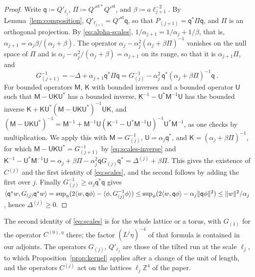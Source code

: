 \documentclass[11pt]{preprint}
\DeclarePairedDelimiter{\norm}{\lVert}{\rVert}
\numberwithin{equation}{section}
\theoremstyle{definition}
\theoremstyle{remark}
\theoremstyle{plain}
\begin{document}
\begin{proof}
Write $\mathsf q \coloneqq Q'_{\ell_j}$, $\Pi \coloneqq Q'^{\mathrm{st}*}Q'^{\mathrm{st}}$, and $\beta \coloneqq a\ell_{j+1}^{-2}$. By Lemma~\ref{lem:composition}, $Q'_{\ell_{j+1}} = Q'^{\mathrm{st}}\mathsf q$, so that $P_{(j+1)} = \mathsf q^*\Pi\mathsf q$, and $\Pi$ is an orthogonal projection. By \eqref{eq:alpha-scales}, $1/\alpha_{j+1} = 1/\alpha_j + 1/\beta$, that is, $\alpha_{j+1} = \alpha_j\beta/(\alpha_j + \beta)$. The operator $\alpha_j - \alpha_j^2(\alpha_j + \beta\Pi)^{-1}$ vanishes on the null space of $\Pi$ and is $\alpha_j - \alpha_j^2/(\alpha_j + \beta) = \alpha_{j+1}$ on its range, so that it is $\alpha_{j+1}\Pi$, and
\begin{equation}\label{eq:scales-inverse}
    G_{(j+1)}^{-1} = -\Delta + \alpha_{j+1}\mathsf q^*\Pi\mathsf q = G_{(j)}^{-1} - \alpha_j^2\,\mathsf q^*(\alpha_j + \beta\Pi)^{-1}\mathsf q\;.
\end{equation}
For bounded operators $\mathsf M$, $\mathsf K$ with bounded inverses and a bounded operator $\mathsf U$ such that $\mathsf M - \mathsf U\mathsf K\mathsf U^*$ has a bounded inverse, $\mathsf K^{-1} - \mathsf U^*\mathsf M^{-1}\mathsf U$ has the bounded inverse $\mathsf K + \mathsf K\mathsf U^*(\mathsf M - \mathsf U\mathsf K\mathsf U^*)^{-1}\mathsf U\mathsf K$, and $(\mathsf M - \mathsf U\mathsf K\mathsf U^*)^{-1} = \mathsf M^{-1} + \mathsf M^{-1}\mathsf U(\mathsf K^{-1} - \mathsf U^*\mathsf M^{-1}\mathsf U)^{-1}\mathsf U^*\mathsf M^{-1}$, as one checks by multiplication. We apply this with $\mathsf M = G_{(j)}^{-1}$, $\mathsf U = \alpha_j\mathsf q^*$, and $\mathsf K = (\alpha_j + \beta\Pi)^{-1}$, for which $\mathsf M - \mathsf U\mathsf K\mathsf U^* = G_{(j+1)}^{-1}$ by \eqref{eq:scales-inverse} and $\mathsf K^{-1} - \mathsf U^*\mathsf M^{-1}\mathsf U = \alpha_j + \beta\Pi - \alpha_j^2\mathsf qG_{(j)}\mathsf q^* = \Delta^{(j)} + \beta\Pi$. This gives the existence of $C^{(j)}$ and the first identity of \eqref{eq:scales}, and the second follows by adding the first over $j$. Finally $G_{(j)}^{-1} \geq \alpha_j\mathsf q^*\mathsf q$ gives $\langle\mathsf q^*w, G_{(j)}\mathsf q^*w\rangle = \sup_\phi(2\langle w, \mathsf q\phi\rangle - \langle\phi, G_{(j)}^{-1}\phi\rangle) \leq \sup_\phi(2\langle w, \mathsf q\phi\rangle - \alpha_j\norm{\mathsf q\phi}^2) \leq \norm{w}^2/\alpha_j$, hence $\Delta^{(j)} \geq 0$.
\end{proof}

The second identity of \eqref{eq:scales} is \cite[(2.34)]{BalabanRDG} for the whole lattice or a torus, with $G_{(1)}$ for the operator $C^{(0),\eta}$ there; the factor $(L^j\eta)^{-4}$ of that formula is contained in our adjoints. The operators $G_{(j)}$, $Q'_{\ell_j}$ are those of the tilted run at the scale $\ell_j$, to which Proposition~\ref{prop:kernel} applies after a change of the unit of length, and the operators $C^{(j)}$ act on the lattices $\ell_j\mathbb Z^4$ of the paper.
\end{document}
